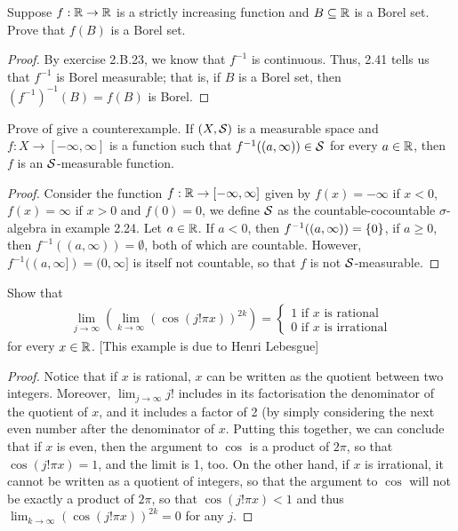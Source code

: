 \begin{exercise}{24}
Suppose $f:\mathbb{R}\to\mathbb{R}$ is a strictly increasing function and $B \subseteq \mathbb{R}$ is a Borel set.
Prove that $f(B)$ is a Borel set.
\end{exercise}
\begin{proof}
By exercise 2.B.23, we know that $f^{-1}$ is continuous.
Thus, 2.41 tells us that $f^{-1}$ is Borel measurable;
that is, if $B$ is a Borel set, then $(f^{-1})^{-1}(B) = f(B)$ is Borel.
\end{proof} 

\begin{exercise}{27}
Prove of give a counterexample.
If $(X,\mathcal{S})$ is a measurable space and $f: X \to [-\infty, \infty]$ is a function such that $f^{-1}((a,\infty)) \in \mathcal{S}$ for every $a\in\mathbb{R}$, then $f$ is an $\mathcal{S}$-measurable function.
\end{exercise}
\begin{proof}
Consider the function $f: \mathbb{R} \to [-\infty, \infty]$ given by $f(x) = -\infty$ if $x<0$, $f(x) = \infty$ if $x>0$ and $f(0) = 0$, we define $\mathcal{S}$ as the countable-cocountable $\sigma$-algebra in example 2.24.
Let $a \in \mathbb{R}$.
If $a<0$, then $f^{-1}((a,\infty)) = \{0\}$, if $a\geq 0$, then $f^{-1}((a,\infty)) = \emptyset$, both of which are countable.
However, $f^{-1}((a,\infty]) = (0,\infty]$ is itself not countable, so that $f$ is not $\mathcal{S}$-measurable.
\end{proof} 

\begin{exercise}{30}
Show that 
\begin{align*}
    \lim_{j\to\infty} (\lim_{k\to\infty} (\cos (j! \pi x))^{2k})
    =\begin{cases}
    1 \text{ if $x$ is rational}\\
    0 \text{ if $x$ is irrational}
    \end{cases}
\end{align*}
for every $x\in\mathbb{R}$.
[This example is due to Henri Lebesgue]
\end{exercise}
\begin{proof}
Notice that if $x$ is rational, $x$ can be written as the quotient between two integers. 
Moreover, $\lim_{j\to\infty} j!$ includes in its factorisation the denominator of the quotient of $x$, and it includes a factor of 2 (by simply considering the next even number after the denominator of $x$.
Putting this together, we can conclude that if $x$ is even, then the argument to $\cos$ is a product of $2\pi$, so that $\cos (j! \pi x) = 1$, and the limit is 1, too.
On the other hand, if $x$ is irrational, it cannot be written as a quotient of integers, so that the argument to $\cos$ will not be exactly a product of $2\pi$, so that $\cos (j! \pi x) < 1$ and thus $\lim_{k\to\infty} (\cos (j! \pi x))^{2k} = 0$ for any $j$.
\end{proof} 
